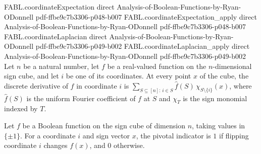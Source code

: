 \begin{theorem}
\proofstep
  {FABL.coordinateExpectation}
  {direct}
  {Analysis-of-Boolean-Functions-by-Ryan-ODonnell}
  {pdf-ffbe9c7b3306-p048-b007}
\proofstep
  {FABL.coordinateExpectation_apply}
  {direct}
  {Analysis-of-Boolean-Functions-by-Ryan-ODonnell}
  {pdf-ffbe9c7b3306-p048-b007}
\proofstep
  {FABL.coordinateLaplacian}
  {direct}
  {Analysis-of-Boolean-Functions-by-Ryan-ODonnell}
  {pdf-ffbe9c7b3306-p049-b002}
\proofstep
  {FABL.coordinateLaplacian_apply}
  {direct}
  {Analysis-of-Boolean-Functions-by-Ryan-ODonnell}
  {pdf-ffbe9c7b3306-p049-b002}
Let $n$ be a natural number, let $f$ be a real-valued function on the $n$-dimensional
sign cube, and let $i$ be one of its coordinates. At every point $x$ of the cube, the
discrete derivative of $f$ in coordinate $i$ is $\displaystyle
\sum_{S\subseteq[n]:\,i\in S}\widehat f(S)\,\chi_{S\setminus\{i\}}(x)$, where $\widehat
f(S)$ is the uniform Fourier coefficient of $f$ at $S$ and $\chi_T$ is the sign monomial
indexed by $T$.
\end{theorem}

\begin{definition}
\label{FABL.pivotalIndicator}
\leanok
{}
Let $f$ be a Boolean function on the sign cube of dimension $n$, taking values in
$\{\pm1\}$. For a coordinate $i$ and sign vector $x$, the pivotal indicator is $1$ if
flipping coordinate $i$ changes $f(x)$, and $0$ otherwise.
\end{definition}

